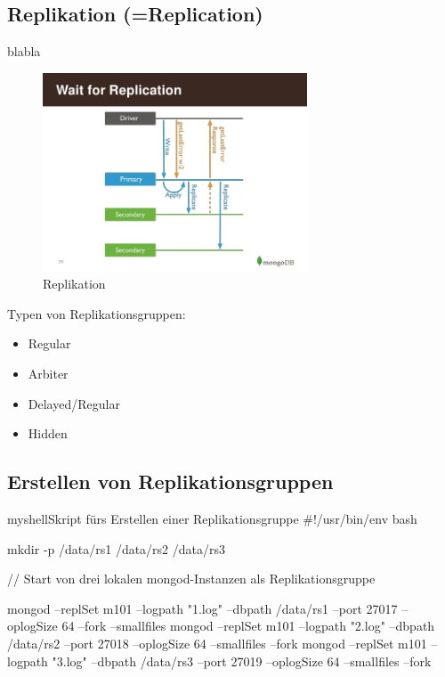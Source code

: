 \subsection{Replikation (=Replication)}
blabla

\begin{figure}
\centering
\includegraphics[width=0.7\textwidth]{resources/replication}
\caption[Replikation]{Replikation\protect\footnotemark}
\label{img:Replikation}
\end{figure}

Typen von Replikationsgruppen:
\begin{itemize}
\item Regular
\item Arbiter
\item Delayed/Regular
\item Hidden
\end{itemize}
\subsection{Erstellen von Replikationsgruppen}

\begin{listingsboxShell}[label={lst:scriptForCreateOfRep}]{myshell}{Skript fürs Erstellen einer Replikationsgruppe}
#!/usr/bin/env bash

mkdir -p /data/rs1 /data/rs2 /data/rs3

// Start von drei lokalen mongod-Instanzen als Replikationsgruppe

mongod --replSet m101 --logpath "1.log" --dbpath /data/rs1 --port 27017
--oplogSize 64 --fork --smallfiles
mongod --replSet m101 --logpath "2.log" --dbpath /data/rs2 --port 27018
--oplogSize 64 --smallfiles --fork
mongod --replSet m101 --logpath "3.log" --dbpath /data/rs3 --port 27019
--oplogSize 64 --smallfiles --fork
\end{listingsboxShell}

